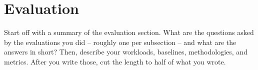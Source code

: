 \section{Evaluation}\label{sec:eval}

Start off with a summary of the evaluation section.
What are the questions asked by the evaluations you did -- roughly one per subsection -- and what are the answers in short?
Then, describe your workloads, baselines, methodologies, and metrics.
After you write those, cut the length to half of what you wrote.
